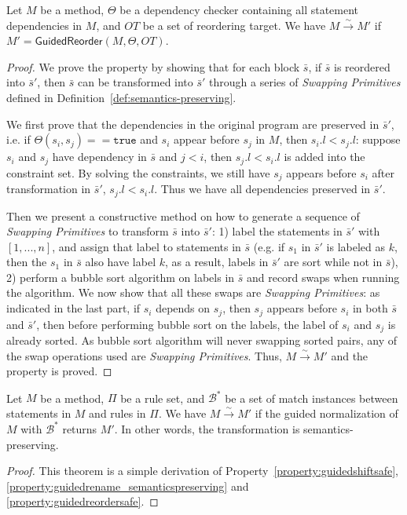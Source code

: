 \documentclass[a4paper, USenglish]{lipics-v2016}
\theoremstyle{plain}
\begin{document}
\begin{prop} 
  Let $M$ be a method, $\Theta$ be a dependency checker containing all
  statement dependencies in $M$, and $\mathit{OT}$ be a set of
  reordering target. We have $M\xrightarrow{\sim}M'$ if $M'=\mathsf{GuidedReorder}(M, \Theta, \mathit{OT})$. 
\end{prop}
\begin{proof}
We prove the property by showing that for each block $\bar{s}$, if $\bar{s}$ is reordered into $\bar{s}'$, then $\bar{s}$ can be transformed into $\bar{s}'$ through a series of \emph{Swapping Primitives} defined in Definition~\ref{def:semantics-preserving}.

We first prove that the dependencies in the original program are preserved in $\bar{s}'$, i.e. if $\Theta(s_i,s_j)==\mathtt{true}$ and $s_i$ appear before $s_j$ in $M$, then $s_i.l < s_j.l$: suppose $s_i$ and $s_j$ have dependency in $\bar{s}$ and $j < i$, then $s_j.l < s_i.l$ is added into the constraint set. By solving the constraints, we still have $s_j$ appears before $s_i$ after transformation in $\bar{s}'$, $s_j.l < s_i.l$. Thus we have all dependencies preserved in $\bar{s}'$.

Then we present a constructive method on how to generate a sequence of \emph{Swapping Primitives} to transform $\bar{s}$ into $\bar{s}'$: 1) label the statements in $\bar{s}'$ with $[1,...,n]$, and assign that label to statements in $\bar{s}$ (e.g. if $s_1$ in $\bar{s}'$ is labeled as $k$, then the $s_1$ in $\bar{s}$ also have label $k$, as a result, labels in $\bar{s}'$ are sort while not in $\bar{s}$), 2) perform a bubble sort algorithm on labels in $\bar{s}$ and record swaps when running the algorithm. We now show that all these swaps are \emph{Swapping Primitives}: as indicated in the last part, if $s_i$ depends on $s_j$, then $s_j$ appears before $s_i$ in both $\bar{s}$ and $\bar{s}'$, then before performing bubble sort on the labels, the label of $s_i$ and $s_j$ is already sorted. As bubble sort algorithm will never swapping sorted pairs, any of the swap operations used are \emph{Swapping Primitives}. Thus, $M\xrightarrow{\sim}M'$ and the property is proved.
\end{proof}

\begin{thm} Let $M$ be a method, $\Pi$ be a rule
  set, and $\mathcal{B}^*$ be a set of match instances between
  statements in $M$ and rules in $\Pi$. We have $M\xrightarrow{\sim}
  M'$ if the guided normalization of $M$ with $\mathcal{B}^*$ returns
  $M'$. In other words, the transformation is semantics-preserving.
\end{thm}
\begin{proof} This theorem is a simple derivation of
  Property~\ref{property:guidedshiftsafe}, \ref{property:guidedrename_semanticspreserving} and \ref{property:guidedreordersafe}.
\end{proof}
\end{document}
